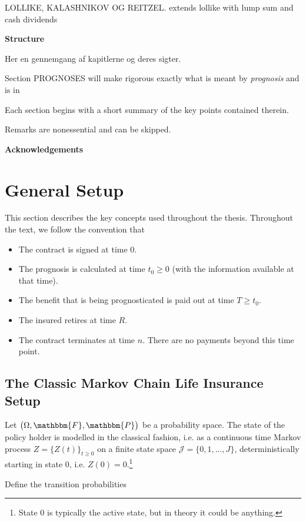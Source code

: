 \documentclass{book}
\newcommand{\1}[1]{\mathbbm{1}_{\left\lbrace #1 \right\rbrace}}
\theoremstyle{break}
\theoremstyle{remark}
\numberwithin{equation}{section}
\begin{document}
LOLLIKE, KALASHNIKOV OG REITZEL. extends lollike with lump sum and cash dividends

\textbf{Structure}

Her en gennemgang af kapitlerne og deres sigter.

Section PROGNOSES will make rigorous exactly what is meant by \textit{prognosis} and is in

Each section begins with a short summary of the key points contained therein.

Remarks are nonessential and can be skipped.

\textbf{Acknowledgements}

\newpage

\chapter{General Setup}

This section describes the key concepts used throughout the thesis. Throughout the text, we follow the convention that 

\begin{itemize}
	\item The contract is signed at time $0$.
	\item The prognosis is calculated at time $t_0 \geq 0$ (with the information available at that time).
	\item The benefit that is being prognosticated is paid out at time $T \geq t_0$.
	\item The insured retires at time $R$.
	\item The contract terminates at time $n$. There are no payments beyond this time point.
\end{itemize}

\section{The Classic Markov Chain Life Insurance Setup}

Let $\left( \Omega, \mathbbm{F}, \mathbbm{P} \right)$ be a probability space. The state of the policy holder is modelled in the classical fashion, i.e. as a continuous time Markov process $Z = \{ Z(t) \}_{t \geq 0}$ on a finite state space $\mathcal{J}= \{ 0, 1, ..., J \} $, deterministically starting in state $0$, i.e. $Z(0) = 0$.\footnote{State 0 is typically the active state, but in theory it could be anything.}

Define the transition probabilities
\end{document}
